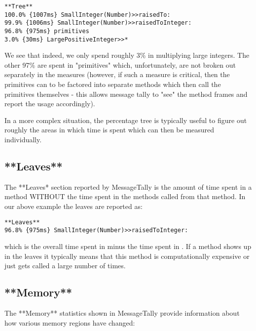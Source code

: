 \documentclass[a4paper,10pt,twoside]{book}
\begin{document}
\begin{verbatim}
**Tree**
100.0% {1007ms} SmallInteger(Number)>>raisedTo:
99.9% {1006ms} SmallInteger(Number)>>raisedToInteger:
96.8% {975ms} primitives
3.0% {30ms} LargePositiveInteger>>*
\end{verbatim}

We see that indeed, we only spend roughly 3\% in multiplying large
integers. The other 97\% are spent in "primitives" which, unfortunately,
are not broken out separately in the measures (however, if such a
measure is critical, then the primitives can to be factored into
separate methods which then call the primitives themselves - this allows
message tally to "see" the method frames and report the usage accordingly).

In a more complex situation, the percentage tree is typically useful to
figure out roughly the areas in which time is spent which can then be
measured individually.

 \subsection{**Leaves**}


The **Leaves* section reported by MessageTally is the amount of time spent in a
method WITHOUT the time spent in the methods called from that method. In
our above example the leaves are reported as:

\begin{verbatim}
**Leaves**
96.8% {975ms} SmallInteger(Number)>>raisedToInteger:
\end{verbatim}

which is the overall time spent in 
minus the time spent in . If a method
shows up in the leaves it typically means that this method is
computationally expensive or just gets called a large number of times.

 \subsection{**Memory**}


The **Memory** statistics shown in MessageTally provide information
about how various memory regions have changed:
\end{document}
